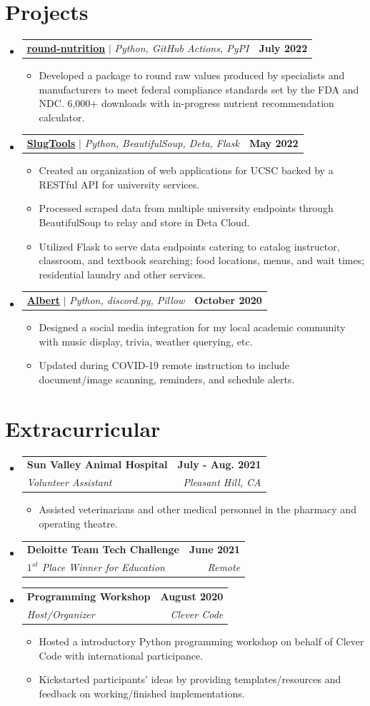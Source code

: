 \documentclass[letterpaper,11pt]{article}
\makeatletter
\newcommand{\resumeItem}[1]{
  \item\small{
    {#1 \vspace{-2pt}}
  }
}
\newcommand{\resumeSubheading}[4]{
  \vspace{-2pt}\item
    \begin{tabular*}{1.0\textwidth}[t]{l@{\extracolsep{\fill}}r}
      \textbf{#1} & \textbf{\small #2} \\
      \textit{\small#3} & \textit{\small #4} \\
    \end{tabular*}\vspace{-7pt}
}
\newcommand{\resumeProjectHeading}[2]{
    \item
    \begin{tabular*}{1.001\textwidth}{l@{\extracolsep{\fill}}r}
      \small#1 & \textbf{\small #2}\\
    \end{tabular*}\vspace{-7pt}
}
\newcommand{\resumeSubHeadingListStart}{\begin{itemize}[leftmargin=0.0in, label={}]}
\newcommand{\resumeSubHeadingListEnd}{\end{itemize}}
\newcommand{\resumeItemListStart}{\begin{itemize}}
\newcommand{\resumeItemListEnd}{\end{itemize}\vspace{-5pt}}
\makeatother
\begin{document}
\section{Projects}
\vspace{-5pt}
\resumeSubHeadingListStart
\resumeProjectHeading
{\textbf{\color[HTML]{0000EE}\href{https://pypi.org/project/round-nutrition}{round-nutrition}} $|$ \emph{Python, GitHub Actions, PyPI}}{July 2022}
\resumeItemListStart
\resumeItem{Developed a package to round raw values produced by specialists and manufacturers to meet federal compliance standards set by the FDA and NDC. 6,000+ downloads with in-progress nutrient recommendation calculator.}
\resumeItemListEnd
\vspace{-13pt}
\resumeProjectHeading
{\textbf{\color[HTML]{0000EE}\href{https://api.slug.tools}{SlugTools}} $|$ \emph{Python, BeautifulSoup, Deta, Flask}}{May 2022}
\resumeItemListStart
\resumeItem{Created an organization of web applications for UCSC backed by a RESTful API for university services.}
\resumeItem{Processed scraped data from multiple university endpoints through BeautifulSoup to relay and store in Deta Cloud.}
\resumeItem{Utilized Flask to serve data endpoints catering to catalog instructor, classroom, and textbook searching; food locations, menus, and wait times; residential laundry and other services.}
\resumeItemListEnd
\vspace{-13pt}
\resumeProjectHeading
{\textbf{\color[HTML]{0000EE}\href{https://github.com/hdadhich01/Albert}{Albert}} $|$ \emph{Python, discord.py, Pillow}}{October 2020}
\resumeItemListStart
\resumeItem{Designed a social media integration for my local academic community with music display, trivia, weather querying, etc.}
\resumeItem{Updated during COVID-19 remote instruction to include document/image scanning, reminders, and schedule alerts.}
\resumeItemListEnd
\resumeSubHeadingListEnd
\vspace{-15pt}

\section{Extracurricular}
\resumeSubHeadingListStart
\resumeSubheading{Sun Valley Animal Hospital}{July - Aug. 2021}{Volunteer Assistant}{Pleasant Hill, CA}
\resumeItemListStart
\resumeItem{Assisted veterinarians and other medical personnel in the pharmacy and operating theatre.}
\resumeItemListEnd
\resumeSubheading{Deloitte Team Tech Challenge}{June 2021}{$1^{st}$ Place Winner for Education}{Remote}
\resumeSubheading{Programming Workshop}{August 2020}{Host/Organizer}{Clever Code}
\resumeItemListStart
\resumeItem{Hosted a introductory Python programming workshop on behalf of Clever Code with international participance.}
\resumeItem{Kickstarted participants' ideas by providing templates/resources and feedback on working/finished implementations.}
\resumeItemListEnd
\resumeSubHeadingListEnd
\vspace{-15pt}
\end{document}

